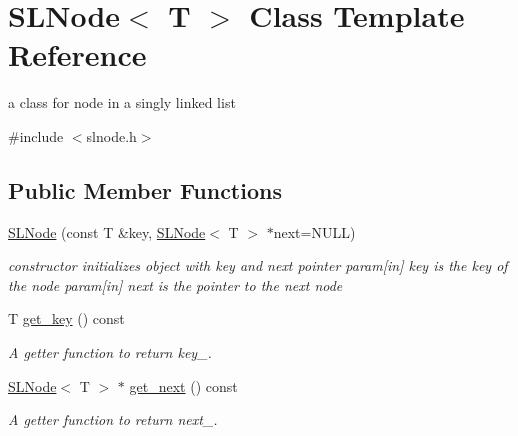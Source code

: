 \hypertarget{classSLNode}{}\section{S\+L\+Node$<$ T $>$ Class Template Reference}
\label{classSLNode}


a class for node in a singly linked list  




{\ttfamily \#include $<$slnode.\+h$>$}

\subsection*{Public Member Functions}
\begin{DoxyCompactItemize}
\item 
\mbox{\label{classSLNode_a9ed6ae92b17f1a2912cc148961f22437}} 
\mbox{\hyperlink{classSLNode_a9ed6ae92b17f1a2912cc148961f22437}{S\+L\+Node}} (const T \&key, \mbox{\hyperlink{classSLNode}{S\+L\+Node}}$<$ T $>$ $\ast$next=N\+U\+LL)
\begin{DoxyCompactList}\small\item\em constructor initializes object with key and next pointer param\mbox{[}in\mbox{]} key is the key of the node param\mbox{[}in\mbox{]} next is the pointer to the next node \end{DoxyCompactList}\item 
\mbox{\label{classSLNode_a450d9f79e125f99090af4daf6c0a615e}} 
T \mbox{\hyperlink{classSLNode_a450d9f79e125f99090af4daf6c0a615e}{get\+\_\+key}} () const
\begin{DoxyCompactList}\small\item\em A getter function to return key\+\_\+. \end{DoxyCompactList}\item 
\mbox{\label{classSLNode_a83668265730e429423c5b85356623fef}} 
\mbox{\hyperlink{classSLNode}{S\+L\+Node}}$<$ T $>$ $\ast$ \mbox{\hyperlink{classSLNode_a83668265730e429423c5b85356623fef}{get\+\_\+next}} () const
\begin{DoxyCompactList}\small\item\em A getter function to return next\+\_\+. \end{DoxyCompactList}\item 
\mbox{\label{classSLNode_a8f8b8bdc7d6748ec3813e13bb2356d97}} 

\end{DoxyCompactItemize}
